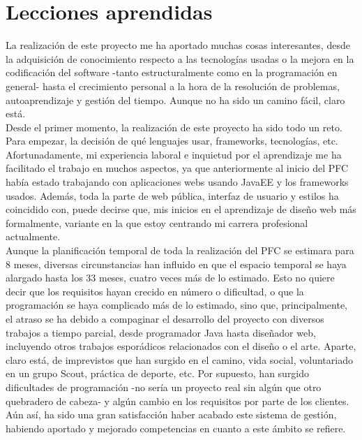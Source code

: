 \section{Lecciones aprendidas}

La realización de este proyecto me ha aportado muchas cosas interesantes, desde la adquisición de conocimiento respecto a las tecnologías usadas o la mejora en la codificación del software -tanto estructuralmente como en la programación en general- hasta el crecimiento personal a la hora de la resolución de problemas, autoaprendizaje y gestión del tiempo. Aunque no ha sido un camino fácil, claro está. \\

Desde el primer momento, la realización de este proyecto ha sido todo un reto. Para empezar, la decisión de qué lenguajes usar, frameworks, tecnologías, etc. Afortunadamente, mi experiencia laboral e inquietud por el aprendizaje me ha facilitado el trabajo en muchos aspectos, ya que anteriormente al inicio del PFC había estado trabajando con aplicaciones webs usando JavaEE y los frameworks usados. Además, toda la parte de web pública, interfaz de usuario y estilos ha coincidido con, puede decirse que, mis inicios en el aprendizaje de diseño web más formalmente, variante en la que estoy centrando mi carrera profesional actualmente. \\

Aunque la planificación temporal de toda la realización del PFC se estimara para 8 meses, diversas circunstancias han influido en que el espacio temporal se haya alargado hasta los 33 meses, cuatro veces más de lo estimado. Esto no quiere decir que los requisitos hayan crecido en número o dificultad, o que la programación se haya complicado más de lo estimado, sino que, principalmente, el atraso se ha debido a compaginar el desarrollo del proyecto con diversos trabajos a tiempo parcial, desde programador Java hasta diseñador web, incluyendo otros trabajos esporádicos relacionados con el diseño o el arte. Aparte, claro está, de imprevistos que han surgido en el camino, vida social, voluntariado en un grupo Scout, práctica de deporte, etc. Por supuesto, han surgido dificultades de programación -no sería un proyecto real sin algún que otro quebradero de cabeza- y algún cambio en los requisitos por parte de los clientes.\\ 

Aún así, ha sido una gran satisfacción haber acabado este sistema de gestión, habiendo aportado y mejorado competencias en cuanto a este ámbito se refiere.  


